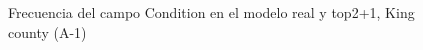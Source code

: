 \begin{figure}[H]
    \centering
    
    \caption{Frecuencia del campo Condition en el modelo real y top2+1, King county (A-1)}
    \label{frecuency-top2+1-condition}
\end{figure}